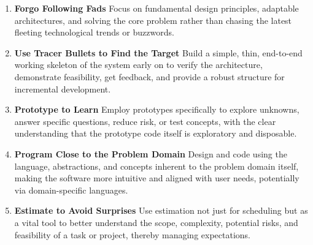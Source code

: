 \documentclass[11pt]{article}
\begin{document}
\begin{enumerate}[label=\arabic*., start=11, itemsep=1ex]
    \item \textbf{Forgo Following Fads}
    Focus on fundamental design principles, adaptable architectures, and solving the core problem rather than chasing the latest fleeting technological trends or buzzwords.

    \item \textbf{Use Tracer Bullets to Find the Target}
    Build a simple, thin, end-to-end working skeleton of the system early on to verify the architecture, demonstrate feasibility, get feedback, and provide a robust structure for incremental development.

    \item \textbf{Prototype to Learn}
    Employ prototypes specifically to explore unknowns, answer specific questions, reduce risk, or test concepts, with the clear understanding that the prototype code itself is exploratory and disposable.

    \item \textbf{Program Close to the Problem Domain}
    Design and code using the language, abstractions, and concepts inherent to the problem domain itself, making the software more intuitive and aligned with user needs, potentially via domain-specific languages.

    \item \textbf{Estimate to Avoid Surprises}
    Use estimation not just for scheduling but as a vital tool to better understand the scope, complexity, potential risks, and feasibility of a task or project, thereby managing expectations.
\end{enumerate}

\newpage
\end{document}
